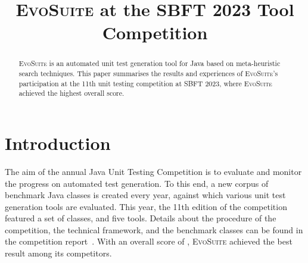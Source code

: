 \documentclass[10pt,conference]{IEEEtran}
\newcommand{\EVOSUITE}{\textsc{EvoSuite}\xspace}
\begin{document}
%

\title{\EVOSUITE at the SBFT 2023 Tool Competition}


\author{%
  \and
  \and
}

\maketitle

\begin{abstract}
  \EVOSUITE is an automated unit test generation tool for Java based
  on meta-heuristic search techniques. This paper summarises the
  results and experiences of \EVOSUITE's participation at the 11th
  unit testing competition at SBFT 2023, where \EVOSUITE achieved the
  highest overall score.
\end{abstract}


\section{Introduction}
%
The aim of the annual Java Unit Testing Competition is to evaluate and monitor
the progress on automated test generation. To this end, a new corpus of benchmark
Java classes is created every year, against which various unit test generation tools
are evaluated. This year, the 11th edition of the competition featured a set of \cuts
classes, and five tools. Details about the procedure of the competition, the
technical framework, and the benchmark classes can be found in the competition
report~\cite{SBFT-toolcomp23}. With an overall score of \score, \EVOSUITE achieved the
best result among its competitors.
\end{document}
